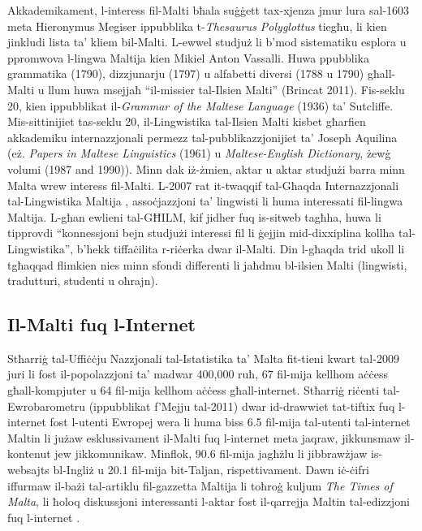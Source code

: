 \documentclass[]{../../metanetpaper}
\begin{document}
\begin{multicols}{2}
Akkademikament, l-interess fil-Malti bħala suġġett tax-xjenza jmur lura sal-1603 meta Hieronymus Megiser ippubblika t-\emph{Thesaurus Polyglottus} tiegħu, li kien jinkludi lista ta’ kliem bil-Malti. L-ewwel studjuż li b’mod sistematiku esplora u ppromwova l-lingwa Maltija kien Mikiel Anton Vassalli. Huwa ppubblika grammatika (1790), dizzjunarju (1797) u alfabetti diversi (1788 u 1790) għall-Malti u llum huwa msejjaħ ``il-missier tal-Ilsien Malti'' (Brincat 2011). Fis-seklu 20, kien ippubblikat il-\emph{Grammar of the Maltese Language} (1936) ta’ Sutcliffe. Mis-sittinijiet tas-seklu 20, il-Lingwistika tal-Ilsien Malti kisbet għarfien akkademiku internazzjonali permezz tal-pubblikazzjonijiet ta’ Joseph Aquilina (eż. \emph{Papers in Maltese Linguistics} (1961) u \emph{Maltese-English Dictionary}, żewġ volumi (1987 and 1990)).  Minn dak iż-żmien, aktar u aktar studjużi barra minn Malta wrew interess fil-Malti. L-2007 rat it-twaqqif tal-Għaqda Internazzjonali tal-Lingwistika Maltija \cite{GHILM2}, assoċjazzjoni ta’ lingwisti li huma interessati fil-lingwa Maltija. L-għan ewlieni tal-GĦILM, kif jidher fuq is-sitweb tagħha, huwa li tipprovdi ``konnessjoni bejn studjużi interessi fil li ġejjin mid-dixxiplina kollha tal-Lingwistika'', b'hekk tiffaċilita r-riċerka dwar il-Malti. Din l-għaqda trid ukoll li tgħaqqad flimkien nies minn sfondi differenti li jaħdmu bl-ilsien Malti (lingwisti, tradutturi, studenti u oħrajn).

\subsection{Il-Malti fuq l-Internet}

Stħarriġ tal-Uffiċċju Nazzjonali tal-Istatistika ta’ Malta fit-tieni kwart tal-2009 \cite{NSO2} juri li fost il-popolazzjoni ta’ madwar 400,000 ruħ, 67 fil-mija kellhom aċċess għall-kompjuter u 64 fil-mija kellhom aċċess għall-internet. Stħarriġ riċenti tal-Ewrobarometru (ippubblikat f'Mejju tal-2011) \cite{Eurobarometer1} dwar id-drawwiet tat-tiftix fuq l-internet fost l-utenti Ewropej wera li huma biss 6.5 fil-mija tal-utenti tal-internet Maltin li jużaw esklussivament il-Malti fuq l-internet meta jaqraw, jikkunsmaw il-kontenut jew jikkomunikaw. Minflok, 90.6 fil-mija jagħżlu li jibbrawżjaw is-websajts bl-Ingliż u 20.1 fil-mija bit-Taljan, rispettivament. Dawn iċ-ċifri iffurmaw il-bażi tal-artiklu fil-gazzetta Maltija li toħroġ kuljum \emph{The Times of Malta}, li ħoloq diskussjoni interessanti l-aktar fost il-qarrejja Maltin tal-edizzjoni fuq l-internet \cite{TimesOfMalta1}.
    

\end{multicols}
\end{document}
